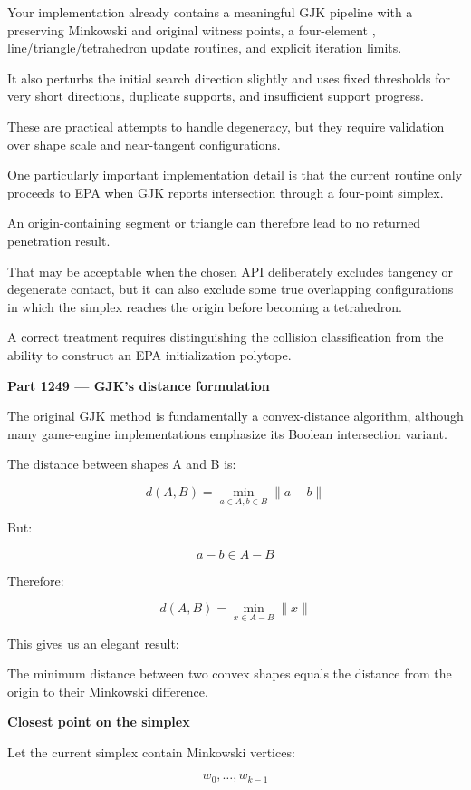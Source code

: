 Your implementation already contains a meaningful GJK pipeline with a  preserving Minkowski and original witness points, a four-element , line/triangle/tetrahedron update routines, and explicit iteration limits.

It also perturbs the initial search direction slightly and uses fixed thresholds for very short directions, duplicate supports, and insufficient support progress.

These are practical attempts to handle degeneracy, but they require validation over shape scale and near-tangent configurations.

One particularly important implementation detail is that the current routine only proceeds to EPA when GJK reports intersection through a four-point simplex.

An origin-containing segment or triangle can therefore lead to no returned penetration result.

That may be acceptable when the chosen API deliberately excludes tangency or degenerate contact, but it can also exclude some true overlapping configurations in which the simplex reaches the origin before becoming a tetrahedron.

A correct treatment requires distinguishing the collision classification from the ability to construct an EPA initialization polytope.

\textbf{Part 1249 --- GJK's distance formulation}

The original GJK method is fundamentally a convex-distance algorithm, although many game-engine implementations emphasize its Boolean intersection variant.

The distance between shapes A and B is:

\[
\boxed{ d(A,B)= \min_{a\in A,b\in B}\|a-b\| }
\]

But:

\[
a-b\in A-B
\]

Therefore:

\[
\boxed{ d(A,B)= \min_{x\in A-B}\|x\| }
\]

This gives us an elegant result:

The minimum distance between two convex shapes equals the distance from the origin to their Minkowski difference.

\textbf{Closest point on the simplex}

Let the current simplex contain Minkowski vertices:

\[
w_0,\ldots,w_{k-1}
\]

